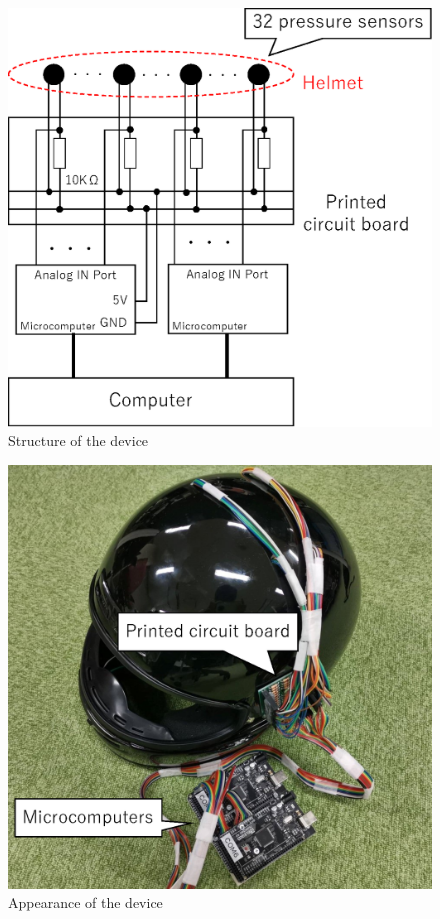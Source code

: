 \documentclass[sigchi,authordraft]{acmart}
\newcommand\figref[1]{\textbf{Figure~\ref{fig:#1}}}
\begin{document}

\begin{figure}[!t]
  \begin{center}
    \includegraphics[width=0.5\linewidth]{figure/device.eps}
  \end{center}
  \caption{Structure of the device}
  \label{fig:device}
\end{figure}

\begin{figure}[!t]
  \begin{center}
    \includegraphics[width=0.4\linewidth]{figure/met_over.eps}
  \end{center}
  \caption{Appearance of the device}
  \label{fig:met_over}
\end{figure}
\end{document}
